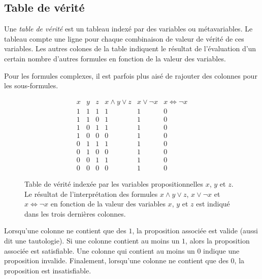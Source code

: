 \subsection{Table de vérité}

Une \og \textit{table de vérité} \fg{} est un tableau indexé par des variables ou métavariables.
Le tableau compte une ligne pour chaque combinaison de valeur de vérité de ces variables.
Les autres colones de la table indiquent le résultat de l'évaluation d'un certain nombre d'autres formules en fonction de la valeur des variables.

Pour les formules complexes, il est parfois plus aisé de rajouter des colonnes pour les sous-formules.

\begin{figure}[h]

\begin{displaymath}
\begin{array}{ccc|ccc}
x & y & z & x \wedge y \vee z & x \vee \neg x & x \iff \neg x\\
\hline
1 & 1 & 1 & 1 & 1 & 0\\
1 & 1 & 0 & 1 & 1 & 0\\
1 & 0 & 1 & 1 & 1 & 0\\
1 & 0 & 0 & 0 & 1 & 0\\
0 & 1 & 1 & 1 & 1 & 0\\
0 & 1 & 0 & 0 & 1 & 0\\
0 & 0 & 1 & 1 & 1 & 0\\
0 & 0 & 0 & 0 & 1 & 0
\end{array}
\end{displaymath}

\caption{Table de vérité indexée par les variables propositionnelles $x$, $y$ et $z$.
Le résultat de l'interprétation des formules $x \wedge y \vee z$, $x \vee \neg x$ et $x \iff \neg x$ en fonction de la valeur des variables $x$, $y$ et $z$ est indiqué dans les trois dernières colonnes.}
\label{fig_table_verite_ex}

\end{figure}

Lorsqu'une colonne ne contient que des $1$, la proposition associée est valide (aussi dit une tautologie).
Si une colonne contient au moins un $1$, alors la proposition associée est satisfiable.
Une colonne qui contient au moins un $0$ indique une proposition invalide.
Finalement, lorsqu'une colonne ne contient que des $0$, la proposition est insatisfiable. 

